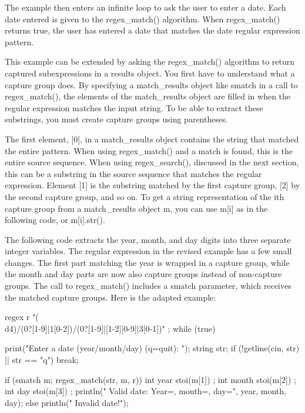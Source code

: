 The example then enters an infinite loop to ask the user to enter a date. Each date entered is given to the regex\_match() algorithm. When regex\_match() returns true, the user has entered a date that matches the date regular expression pattern.

This example can be extended by asking the regex\_match() algorithm to return captured subexpressions in a results object. You first have to understand what a capture group does. By specifying a match\_results object like smatch in a call to regex\_match(), the elements of the match\_results object are filled in when the regular expression matches the input string. To be able to extract these substrings, you must create capture groups using parentheses.

The first element, [0], in a match\_results object contains the string that matched the entire pattern. When using regex\_match() and a match is found, this is the entire source sequence. When using regex\_search(), discussed in the next section, this can be a substring in the source sequence that matches the regular expression. Element [1] is the substring matched by the first capture group, [2] by the second capture group, and so on. To get a string representation of the ith capture group from a match\_results object m, you can use m[i] as in the following code, or m[i].str().

The following code extracts the year, month, and day digits into three separate integer variables. The regular expression in the revised example has a few small changes. The first part matching the year is wrapped in a capture group, while the month and day parts are now also capture groups instead of non-capture groups. The call to regex\_match() includes a smatch parameter, which receives the matched capture groups. Here is the adapted example:

\begin{cpp}
regex r { "(\\d{4})/(0?[1-9]|1[0-2])/(0?[1-9]|[1-2][0-9]|3[0-1])" };
while (true) {
    print("Enter a date (year/month/day) (q=quit): ");
    string str;
    if (!getline(cin, str) || str == "q") { break; }

    if (smatch m; regex_match(str, m, r)) {
        int year { stoi(m[1]) };
        int month { stoi(m[2]) };
        int day { stoi(m[3]) };
        println(" Valid date: Year={}, month={}, day={}", year, month, day);
    } else {
        println(" Invalid date!");
    }
}
\end{cpp}

